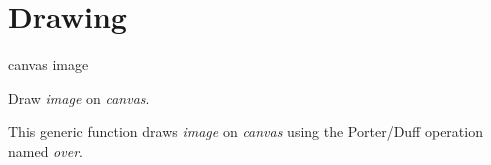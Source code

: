 \chapter{Drawing}
\label{chap-drawing}

 {canvas image}

Draw \textit{image} on \textit{canvas}.

This generic function draws \textit{image} on \textit{canvas} using
the Porter/Duff \cite{Porter:1984:CDI:800031.808606}
\cite{Porter:1984:CDI:964965.808606}
operation named \emph{over}.
